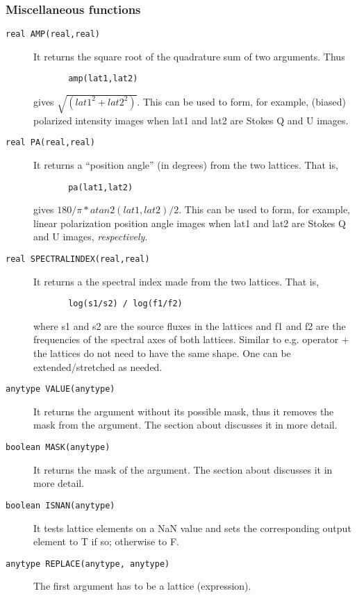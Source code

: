 \subsubsection{Miscellaneous functions}
\begin{description}
  \item[ \texttt{real AMP(real,real)}]
    It returns the square root of the quadrature sum of two
    arguments.  Thus
    \begin{verbatim}
       amp(lat1,lat2)
    \end{verbatim}
    gives $\sqrt{(lat1^2+lat2^2)}$.  This can be used to form, for
    example, (biased) polarized intensity images when lat1 and lat2
    are Stokes Q and U images.
  \item[ \texttt{real PA(real,real)}]
    It returns a ``position angle'' (in degrees) from the two lattices.  That is,
    \begin{verbatim}
       pa(lat1,lat2)
    \end{verbatim}
    gives $180/\pi*atan2(lat1,lat2)/2$.  This can be used to form, for
    example, linear polarization position angle images when
    lat1 and lat2  are Stokes Q and U images, {\it respectively}.
  \item[ \texttt{real SPECTRALINDEX(real,real)}]
    It returns a the spectral index made from the two lattices.  That is,
    \begin{verbatim}
       log(s1/s2) / log(f1/f2)
    \end{verbatim}
    where s1 and s2 are the source fluxes in the lattices and f1 and f2
    are the frequencies of the spectral axes of both lattices.
    Similar to e.g. operator + the lattices do not need to have the
    same shape. One can be extended/stretched as needed.
  \item[ \texttt{anytype VALUE(anytype)}]
    It returns the argument without its possible mask, thus it removes
    the mask from the argument.
    The section about 
    discusses it in more detail.
  \item[ \texttt{boolean MASK(anytype)}]
    It returns the mask of the argument.
    The section about 
    discusses it in more detail.
  \item[ \texttt{boolean ISNAN(anytype)}]
    It tests lattice elements on a NaN value and sets the corresponding
    output element to T if so; otherwise to F.
  \item[ \texttt{anytype REPLACE(anytype, anytype)}]
    The first argument has to be a lattice (expression).

\end{description}

